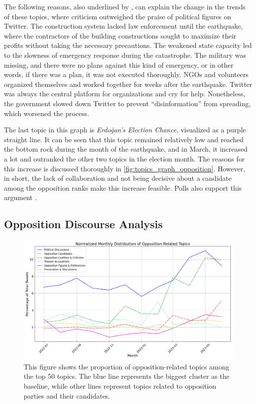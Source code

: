 The following reasons, also underlined by \textcite{cevik_aksoy_turkey_earthquake_2023}, can explain 
the change in the trends of these topics, where criticism outweighed the praise of political figures 
on Twitter. The construction system lacked law enforcement until the earthquake, where the 
contractors of the building constructions sought to maximize their profits without taking the 
necessary precautions. 
The weakened state capacity led to the slowness of emergency response during the catastrophe. 
The military was missing, and there were no plans against this kind of emergency, or in other words, 
if there was a plan, it was not executed thoroughly. 
NGOs and volunteers organized themselves and worked together for weeks after the earthquake. Twitter was always 
the central platform for organizations and cry for help. Nonetheless, the government slowed down 
Twitter to prevent ``disinformation'' from spreading, which worsened the process.

The last topic in this graph is \textit{Erdoğan's Election Chance}, visualized as a purple straight line. 
It can be seen that this topic remained relatively low and reached the bottom rock during the month 
of the earthquake, and in March, it increased a lot and outranked the other two topics in the election 
month. The reasons for this increase is discussed thoroughly in \autoref{fig:topics_graph_opposition}. 
However, in short, the lack of collaboration and not being decisive about a candidate among the 
opposition ranks make this increase feasible. Polls also support this 
argument \parencite{cevik_aksoy_turkey_earthquake_2023}.

\subsection{Opposition Discourse Analysis}

\begin{figure}[htb]
    \centering
    \includegraphics[width=\linewidth]{figures/normalized_opposition_selected_topics_distribution_with_styles.png}
    \caption[Normalized Monthly Distribution of Opposition Related Topics]
    {This figure shows the proportion of opposition-related topics among the top 50 topics. 
    The blue line represents the biggest cluster as the baseline, while other lines represent topics 
    related to opposition parties and their candidates.}\label{fig:topics_graph_opposition}
\end{figure}

